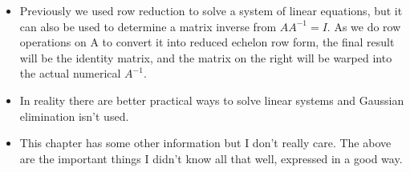 \documentclass{article}
\begin{document}
\begin{itemize}
		\item Previously we used row reduction to solve a system of linear equations, but it can also be used to determine a matrix inverse from $AA^{-1}=I$. As we do row operations on A to convert it into reduced echelon row form, the final result will be the identity matrix, and the matrix on the right will be warped into the actual numerical $A^{-1}$.
		
		\item In reality there are better practical ways to solve linear systems and Gaussian elimination isn't used.
		
		\item This chapter has some other information but I don't really care. The above are the important things I didn't know all that well, expressed in a good way.
	\end{itemize}
\end{document}
